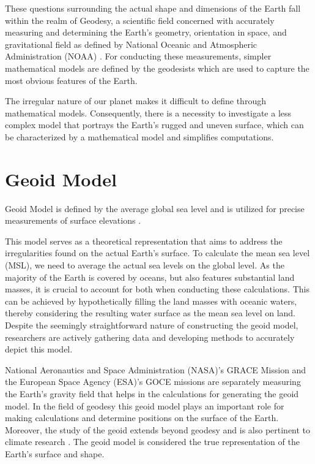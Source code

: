 These questions surrounding the actual shape and dimensions of the Earth fall within the realm of Geodesy, a scientific field concerned with accurately measuring and
determining the Earth's geometry, orientation in space, and gravitational field as defined by National Oceanic and Atmospheric Administration (NOAA) \cite{GEODESY}.
For conducting these measurements, simpler mathematical models are defined by the geodesists which are used to capture the most obvious features of the Earth.

The irregular nature of our planet makes it difficult to define through mathematical models.
Consequently, there is a necessity to investigate a less complex model that portrays the Earth's rugged and uneven surface, which can be characterized by a mathematical model
and simplifies computations.

\section{Geoid Model}
Geoid Model is defined by the average global sea level and is utilized for precise measurements of surface elevations \cite{NOAA_GEOID}.

This model serves as a theoretical representation that aims to address the irregularities found on the actual Earth's surface. To calculate the mean sea level (MSL), we need to average the actual sea levels on the global level.
As the majority of the Earth is covered by oceans, but also features substantial land masses, it is crucial to account for both when conducting these calculations.
This can be achieved by hypothetically filling the land masses with oceanic waters, thereby considering the resulting water surface as the mean sea level on land. Despite the seemingly straightforward nature of constructing the geoid model, researchers are actively gathering data and developing methods to accurately depict this model.

National Aeronautics and Space Administration (NASA)'s GRACE Mission and the European Space Agency (ESA)'s GOCE missions are separately measuring the Earth's gravity field that helps in the calculations for generating the geoid model.
In the field of geodesy this geoid model plays an important role for making calculations and determine positions on the surface of the Earth. Moreover, the study of the geoid
extends beyond geodesy and is also pertinent to climate research \cite{GISGEO_GEOID}.
The geoid model is considered the true representation of the Earth's surface and shape.

